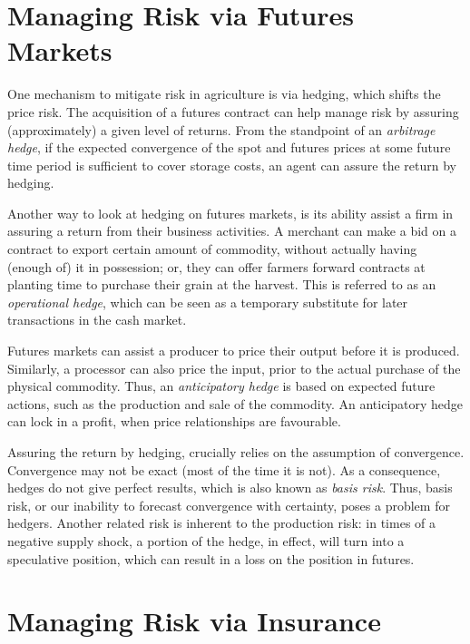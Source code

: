 \documentclass[
  oneside]{book}
\begin{document}
\hypertarget{managing-risk-via-futures-markets}{%
\section{Managing Risk via Futures Markets}\label{managing-risk-via-futures-markets}}

One mechanism to mitigate risk in agriculture is via hedging, which shifts the price risk. The acquisition of a futures contract can help manage risk by assuring (approximately) a given level of returns. From the standpoint of an \emph{arbitrage hedge}, if the expected convergence of the spot and futures prices at some future time period is sufficient to cover storage costs, an agent can assure the return by hedging.

Another way to look at hedging on futures markets, is its ability assist a firm in assuring a return from their business activities. A merchant can make a bid on a contract to export certain amount of commodity, without actually having (enough of) it in possession; or, they can offer farmers forward contracts at planting time to purchase their grain at the harvest. This is referred to as an \emph{operational hedge}, which can be seen as a temporary substitute for later transactions in the cash market.

Futures markets can assist a producer to price their output before it is produced. Similarly, a processor can also price the input, prior to the actual purchase of the physical commodity. Thus, an \emph{anticipatory hedge} is based on expected future actions, such as the production and sale of the commodity. An anticipatory hedge can lock in a profit, when price relationships are favourable.

Assuring the return by hedging, crucially relies on the assumption of convergence. Convergence may not be exact (most of the time it is not). As a consequence, hedges do not give perfect results, which is also known as \emph{basis risk}. Thus, basis risk, or our inability to forecast convergence with certainty, poses a problem for hedgers. Another related risk is inherent to the production risk: in times of a negative supply shock, a portion of the hedge, in effect, will turn into a speculative position, which can result in a loss on the position in futures.

\hypertarget{managing-risk-via-insurance}{%
\section{Managing Risk via Insurance}\label{managing-risk-via-insurance}}
\end{document}
